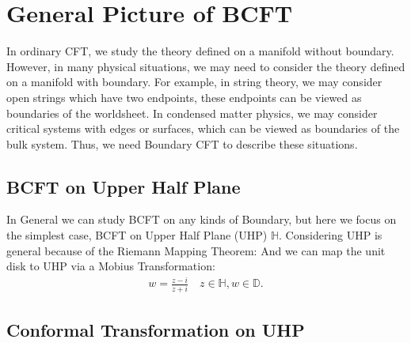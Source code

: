 
\newpage

\section{General Picture of BCFT}

In ordinary CFT, we study the theory defined on a manifold without
boundary. However, in many physical situations, we may need to
consider the theory defined on a manifold with boundary. For example,
in string theory, we may consider open strings which have two
endpoints, these endpoints can be viewed as boundaries of the
worldsheet. In condensed matter physics, we may consider critical
systems with edges or surfaces, which can be viewed as boundaries of
the bulk system. Thus, we need Boundary CFT to describe these situations.

\subsection{BCFT on Upper Half Plane}

In General we can study BCFT on any kinds of Boundary, but here we
focus on the simplest case, BCFT on Upper Half Plane (UHP) $
\mathbb{H} $. Considering UHP is general because of the Riemann Mapping Theorem:
And we can map the unit disk to UHP via a Mobius Transformation:
\begin{align}
  w=\frac{z-i}{z+i} \quad z \in \mathbb{H} ,  w \in \mathbb{D}.
\end{align}

\subsection{Conformal Transformation on UHP}

